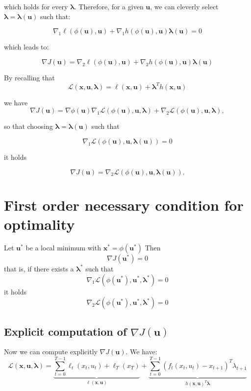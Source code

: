\documentclass[openany]{book}
\theoremstyle{definition}
\theoremstyle{remark}
\begin{document}
which holds for every $\boldsymbol{\lambda}$. Therefore, for a given $\mathbf{u}$, we can cleverly select $\boldsymbol{\lambda} = \boldsymbol{\lambda}(\mathbf{u})$ such that:

\[
\nabla_1\ell(\phi(\mathbf{u}), \mathbf{u}) + \nabla_1h(\phi(\mathbf{u}), \mathbf{u})\boldsymbol{\lambda}(\mathbf{u}) = 0
\]

which leads to:

\[
\nabla J(\mathbf{u}) = \nabla_2\ell(\phi(\mathbf{u}), \mathbf{u}) + \nabla_2h(\phi(\mathbf{u}), \mathbf{u})\boldsymbol{\lambda}(\mathbf{u})
\]

By recalling that
\[
\mathcal{L}(\mathbf{x}, \mathbf{u}, \boldsymbol{\lambda}) = \ell(\mathbf{x}, \mathbf{u}) + \boldsymbol{\lambda}^Th(\mathbf{x}, \mathbf{u})
\]

we have
\[
\nabla J(\mathbf{u}) = \nabla\phi(\mathbf{u})\nabla_1\mathcal{L}(\phi(\mathbf{u}), \mathbf{u}, \boldsymbol{\lambda}) + \nabla_2\mathcal{L}(\phi(\mathbf{u}), \mathbf{u}, \boldsymbol{\lambda}),
\]

so that choosing $\boldsymbol{\lambda} = \boldsymbol{\lambda}(\mathbf{u})$ such that

\[
\nabla_1\mathcal{L}(\phi(\mathbf{u}), \mathbf{u}, \boldsymbol{\lambda}(\mathbf{u})) = 0
\]

it holds

\[
\nabla J(\mathbf{u}) = \nabla_2\mathcal{L}(\phi(\mathbf{u}), \mathbf{u}, \boldsymbol{\lambda}(\mathbf{u})).
\]


\section{First order necessary condition for optimality}
Let $\mathbf{u}^*$ be a local minimum with $\mathbf{x}^* = \phi(\mathbf{u}^*)$ 
Then
\[
    \nabla J(\mathbf{u^*}) = 0
\]
that is, if there exists a $\boldsymbol{\lambda}^*$ such that 
\[
    \nabla_1\mathcal{L}(\phi(\mathbf{u}^*),\mathbf{u}^*,\boldsymbol{\lambda}^*)=0
\]
it holds 
\[
    \nabla_2\mathcal{L}(\phi(\mathbf{u}^*),\mathbf{u}^*,\boldsymbol{\lambda}^*)=0
\]


\subsection{Explicit computation of \texorpdfstring{$\nabla J(\mathbf{u})$}{Explicit computation of the gradient of J(u)}}

Now we can compute explicitly $\nabla J(\mathbf{u})$. We have:
\[
\mathcal{L}(\mathbf{x}, \mathbf{u}, \boldsymbol{\lambda}) = \underbrace{\sum_{t=0}^{T-1} \ell_t(x_t, u_t) + \ell_T(x_T)}_{\ell(\mathbf{x},\mathbf{u})} + \underbrace{\sum_{t=0}^{T-1} (f_t(x_t, u_t) - x_{t+1})^T\lambda_{t+1}}_{h(\mathbf{x},\mathbf{u})^T \boldsymbol{\lambda}}
\]
\end{document}
